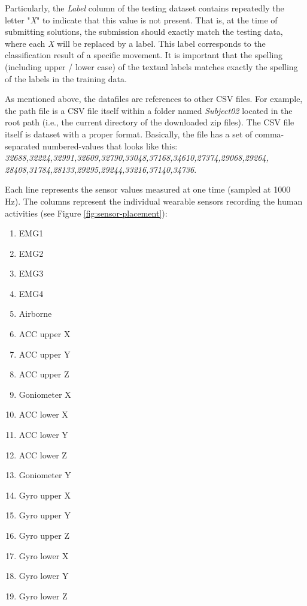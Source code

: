 Particularly, the \emph{Label} column of the testing dataset contains repeatedly the letter "\textit{X}"
to indicate that this value is not present. That is, at the time of submitting solutions, the submission should
exactly match the testing data, where each \emph{X} will be replaced by a label. This label corresponds to the
classification result of a specific movement. It is important that the spelling (including upper / lower
case) of the textual labels matches exactly the spelling of the labels in the training data.

As mentioned above, the datafiles are references to other CSV files. For example, the path file
 is a CSV file itself within a folder named \emph{Subject02}
located in the root path (i.e., the current directory of the downloaded zip files). The CSV file itself
is dataset with a proper format. Basically, the file has a set of comma-separated numbered-values
that looks like this: \textit{32688,32224,32991,32609,32790,33048,37168,34610,27374,29068,29264,
28408,31784,28133,29295,29244,33216,37140,34736}.

Each line represents the sensor values measured at one time (sampled at 1000 Hz). The columns
represent the individual wearable sensors recording the human activities (see Figure \ref{fig:sensor-placement}):

\begin{enumerate}
    \item EMG1
    \item EMG2
    \item EMG3
    \item EMG4
    \item Airborne
    \item ACC upper X
    \item ACC upper Y
    \item ACC upper Z
    \item Goniometer X
    \item ACC lower X
    \item ACC lower Y
    \item ACC lower Z
    \item Goniometer Y
    \item Gyro upper X
    \item Gyro upper Y
    \item Gyro upper Z
    \item Gyro lower X
    \item Gyro lower Y
    \item Gyro lower Z
\end{enumerate}

